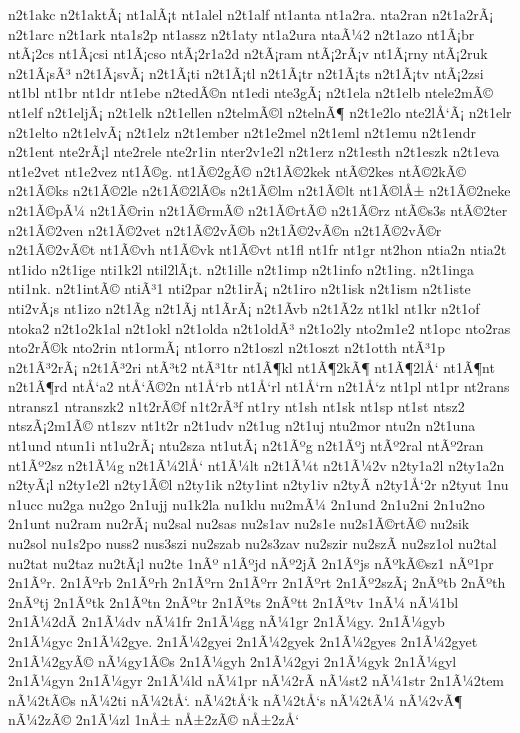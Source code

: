 {n2t1akc
n2t1aktÃ¡
nt1alÃ¡t
nt1alel
n2t1alf
nt1anta
nt1a2ra.
nta2ran
n2t1a2rÃ¡
n2t1arc
n2t1ark
nta1s2p
nt1assz
n2t1aty
nt1a2ura
ntaÃ¼2
n2t1azo
nt1Ã¡br
ntÃ¡2cs
nt1Ã¡csi
nt1Ã¡cso
ntÃ¡2r1a2d
n2tÃ¡ram
ntÃ¡2rÃ¡v
nt1Ã¡rny
ntÃ¡2ruk
n2t1Ã¡sÃ³
n2t1Ã¡svÃ¡
n2t1Ã¡ti
n2t1Ã¡tl
n2t1Ã¡tr
n2t1Ã¡ts
n2t1Ã¡tv
ntÃ¡2zsi
nt1bl
nt1br
nt1dr
nt1ebe
n2tedÃ©n
nt1edi
nte3gÃ¡
n2t1ela
n2t1elb
ntele2mÃ©
nt1elf
n2t1eljÃ¡
n2t1elk
n2t1ellen
n2telmÃ©l
n2telnÃ¶
n2t1e2lo
nte2lÅ‘Ã¡
n2t1elr
n2t1elto
n2t1elvÃ¡
n2t1elz
n2t1ember
n2t1e2mel
n2t1eml
n2t1emu
n2t1endr
n2t1ent
nte2rÃ¡l
nte2rele
nte2r1in
nter2v1e2l
n2t1erz
n2t1esth
n2t1eszk
n2t1eva
nt1e2vet
nt1e2vez
nt1Ã©g.
nt1Ã©2gÃ©
n2t1Ã©2kek
ntÃ©2kes
ntÃ©2kÃ©
n2t1Ã©ks
n2t1Ã©2le
n2t1Ã©2lÃ©s
n2t1Ã©lm
n2t1Ã©lt
nt1Ã©lÅ±
n2t1Ã©2neke
n2t1Ã©pÃ¼
n2t1Ã©rin
n2t1Ã©rmÃ©
n2t1Ã©rtÃ©
n2t1Ã©rz
ntÃ©s3s
ntÃ©2ter
n2t1Ã©2ven
n2t1Ã©2vet
n2t1Ã©2vÃ©b
n2t1Ã©2vÃ©n
n2t1Ã©2vÃ©r
n2t1Ã©2vÃ©t
nt1Ã©vh
nt1Ã©vk
nt1Ã©vt
nt1fl
nt1fr
nt1gr
nt2hon
ntia2n
ntia2t
nt1ido
n2t1ige
nti1k2l
ntil2lÃ¡t.
n2t1ille
n2t1imp
n2t1info
n2t1ing.
n2t1inga
nti1nk.
n2t1intÃ©
ntiÃ³1
nti2par
n2t1irÃ¡
n2t1iro
n2t1isk
n2t1ism
n2t1iste
nti2vÃ¡s
nt1izo
n2t1Ã­g
n2t1Ã­j
nt1Ã­rÃ¡
n2t1Ã­vb
n2t1Ã­2z
nt1kl
nt1kr
n2t1of
ntoka2
n2t1o2k1al
n2t1okl
n2t1olda
n2t1oldÃ³
n2t1o2ly
nto2m1e2
nt1opc
nto2ras
nto2rÃ©k
nto2rin
nt1ormÃ¡
nt1orro
n2t1oszl
n2t1oszt
n2t1otth
ntÃ³1p
n2t1Ã³2rÃ¡
n2t1Ã³2ri
ntÃ³t2
ntÃ³1tr
nt1Ã¶kl
nt1Ã¶2kÃ¶
nt1Ã¶2lÅ‘
nt1Ã¶nt
n2t1Ã¶rd
ntÅ‘a2
ntÅ‘Ã©2n
nt1Å‘rb
nt1Å‘rl
nt1Å‘rn
n2t1Å‘z
nt1pl
nt1pr
nt2rans
ntransz1
ntranszk2
n1t2rÃ©f
n1t2rÃ³f
nt1ry
nt1sh
nt1sk
nt1sp
nt1st
ntsz2
ntszÃ¡2m1Ã©
nt1szv
nt1t2r
n2t1udv
n2t1ug
n2t1uj
ntu2mor
ntu2n
n2t1una
nt1und
ntun1i
nt1u2rÃ¡
ntu2sza
nt1utÃ¡
n2t1Ãºg
n2t1Ãºj
ntÃº2ral
ntÃº2ran
nt1Ãº2sz
n2t1Ã¼g
n2t1Ã¼2lÅ‘
nt1Ã¼lt
n2t1Ã¼t
n2t1Ã¼2v
n2ty1a2l
n2ty1a2n
n2tyÃ¡l
n2ty1e2l
n2ty1Ã©l
n2ty1ik
n2ty1int
n2ty1iv
n2tyÃ­
n2ty1Å‘2r
n2tyut
1nu
n1ucc
nu2ga
nu2go
2n1ujj
nu1k2la
nu1klu
nu2mÃ¼
2n1und
2n1u2ni
2n1u2no
2n1unt
nu2ram
nu2rÃ¡
nu2sal
nu2sas
nu2s1av
nu2s1e
nu2s1Ã©rtÃ©
nu2sik
nu2sol
nu1s2po
nuss2
nus3szi
nu2szab
nu2s3zav
nu2szir
nu2szÃ­
nu2sz1ol
nu2tal
nu2tat
nu2taz
nu2tÃ¡l
nu2te
1nÃº
n1Ãºjd
nÃº2jÃ­
2n1Ãºjs
nÃºkÃ©sz1
nÃº1pr
2n1Ãºr.
2n1Ãºrb
2n1Ãºrh
2n1Ãºrn
2n1Ãºrr
2n1Ãºrt
2n1Ãº2szÃ¡
2nÃºtb
2nÃºth
2nÃºtj
2n1Ãºtk
2n1Ãºtn
2nÃºtr
2n1Ãºts
2nÃºtt
2n1Ãºtv
1nÃ¼
nÃ¼1bl
2n1Ã¼2dÃ­
2n1Ã¼dv
nÃ¼1fr
2n1Ã¼gg
nÃ¼1gr
2n1Ã¼gy.
2n1Ã¼gyb
2n1Ã¼gyc
2n1Ã¼2gye.
2n1Ã¼2gyei
2n1Ã¼2gyek
2n1Ã¼2gyes
2n1Ã¼2gyet
2n1Ã¼2gyÃ©
nÃ¼gy1Ã©s
2n1Ã¼gyh
2n1Ã¼2gyi
2n1Ã¼gyk
2n1Ã¼gyl
2n1Ã¼gyn
2n1Ã¼gyr
2n1Ã¼ld
nÃ¼1pr
nÃ¼2rÃ­
nÃ¼st2
nÃ¼1str
2n1Ã¼2tem
nÃ¼2tÃ©s
nÃ¼2ti
nÃ¼2tÅ‘.
nÃ¼2tÅ‘k
nÃ¼2tÅ‘s
nÃ¼2tÃ¼
nÃ¼2vÃ¶
nÃ¼2zÃ©
2n1Ã¼zl
1nÅ±
nÅ±2zÃ©
nÅ±2zÅ‘
}
